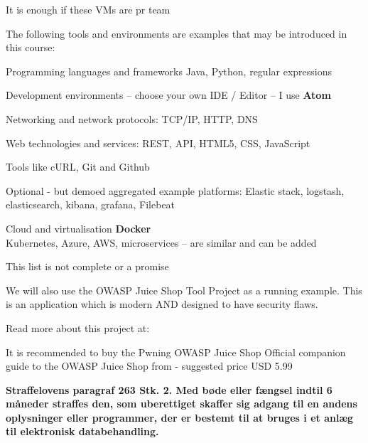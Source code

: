 \documentclass[Screen16to9,17pt]{foils}
\begin{document}
\centerline{It is enough if these VMs are pr team}



The following tools and environments are examples that may be introduced in this course:

\begin{list2}
\item Programming languages and frameworks Java, Python, regular expressions
\item Development environments -- choose your own IDE / Editor -- I use {\bf Atom}
\item Networking and network protocols: TCP/IP, HTTP, DNS
\item Web technologies and services: REST, API, HTML5, CSS, JavaScript
\item Tools like cURL, Git and Github
\item Optional - but demoed aggregated example platforms: Elastic stack, logstash, elasticsearch, kibana, grafana, Filebeat
\item Cloud and virtualisation {\bf Docker}\\
Kubernetes, Azure, AWS, microservices -- are similar and can be added
\end{list2}

\centerline{This list is not complete or a promise }





We will also use the OWASP Juice Shop Tool Project as a running example. This is an application which is modern AND designed to have security flaws.

Read more about this project at: \\ 

It is recommended to buy the Pwning OWASP Juice Shop Official companion guide to the OWASP Juice Shop from  - suggested price USD 5.99



\vskip 1cm
{\bfseries Straffelovens paragraf 263 Stk. 2. Med bøde eller fængsel
  indtil 6 måneder
straffes den, som uberettiget skaffer sig adgang til en andens
oplysninger eller programmer, der er bestemt til at bruges i et anlæg
til elektronisk databehandling.}
\end{document}
